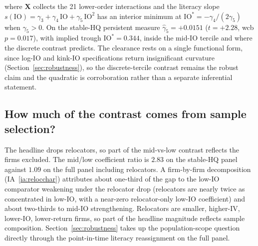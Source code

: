 where $\mathbf{X}$ collects the 21 lower-order interactions and the literacy slope $s(\mathrm{IO}) = \gamma_{3} + \gamma_{4}\,\mathrm{IO} + \gamma_{5}\,\mathrm{IO}^{2}$ has an interior minimum at $\mathrm{IO}^{\ast} = -\gamma_{4}/(2\gamma_{5})$ when $\gamma_{5} > 0$. On the stable-HQ persistent measure $\hat\gamma_{5} = +0.0151$ ($t = +2.28$, wcb $p = 0.017$), with implied trough $\mathrm{IO}^{\ast} = 0.344$, inside the mid-IO tercile and where the discrete contrast predicts. The clearance rests on a single functional form, since log-IO and kink-IO specifications return insignificant curvature (Section~\ref{sec:robustness}), so the discrete-tercile contrast remains the robust claim and the quadratic is corroboration rather than a separate inferential statement.

\subsection{How much of the contrast comes from sample selection?}
\label{sec:relocator}

The headline drops relocators, so part of the mid-vs-low contrast reflects the firms excluded. The mid/low coefficient ratio is $2.83$ on the stable-HQ panel against $1.09$ on the full panel including relocators. A firm-by-firm decomposition (IA~\ref{ia:relocchar}) attributes about one-third of the gap to the low-IO comparator weakening under the relocator drop (relocators are nearly twice as concentrated in low-IO, with a near-zero relocator-only low-IO coefficient) and about two-thirds to mid-IO strengthening. Relocators are smaller, higher-IV, lower-IO, lower-return firms, so part of the headline magnitude reflects sample composition. Section~\ref{sec:robustness} takes up the population-scope question directly through the point-in-time literacy reassignment on the full panel.
